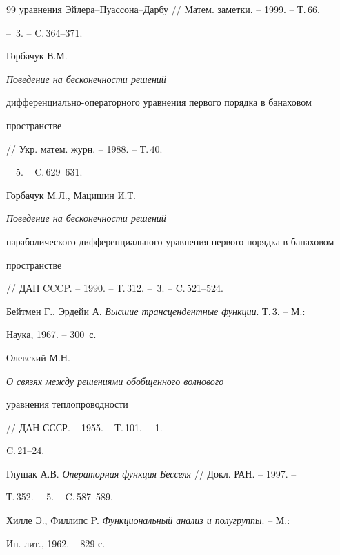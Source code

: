 \begin{thebibliography}{99}
{уравнения Эйлера--Пуассона--Дарбу} // Матем. заметки. -- 1999. -- Т.\,66.


-- \No\,3. -- C.\,364--371.




Горбачук В.М. {\it Поведение на бесконечности решений 


дифференциально-операторного уравнения первого порядка в банаховом 


пространстве} // Укр. матем. журн. -- 1988. -- Т.\,40.


-- \No\,5. -- C.\,629--631.




Горбачук М.Л., Мацишин И.Т. {\it Поведение на бесконечности решений 


параболического дифференциального уравнения первого порядка в банаховом 


пространстве} // ДАН CCCP. -- 1990. -- Т.\,312. -- \No\,3. -- C.\,521--524.




Бейтмен Г., Эрдейи А. {\it Высшие трансцендентные функции}. Т.\,3. -- М.:


Наука, 1967. -- 300~с.




Олевский М.Н. {\it О связях между решениями обобщенного волнового


уравнения теплопроводности} // ДАН СССР. -- 1955. -- Т.\,101. -- \No\,1. --


C.\,21--24.




Глушак А.В. {\it Операторная функция Бесселя} // Докл. РАН. -- 1997. -- 


Т.\,352. -- \No\,5. -- C.\,587--589.




Хилле Э., Филлипс P. {\it Функциональный анализ и полугруппы}. -- М.:


Ин. лит., 1962. -- 829 с.





\end{thebibliography}





\vskip 2cm














\label{end}





